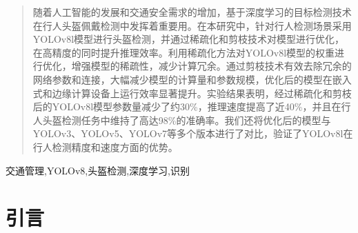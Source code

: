 \documentclass[journal]{IEEEtran}
\begin{document}







\maketitle

\begin{abstract}
随着人工智能的发展和交通安全需求的增加，基于深度学习的目标检测技术在行人头盔佩戴检测中发挥着重要用。在本研究中，针对行人检测场景采用YOLOv8l模型进行头盔检测，并通过稀疏化和剪枝技术对模型进行优化，在高精度的同时提升推理效率。利用稀疏化方法对YOLOv8l模型的权重进行优化，增强模型的稀疏性，减少计算冗余。通过剪枝技术有效去除冗余的网络参数和连接，大幅减少模型的计算量和参数规模，优化后的模型在嵌入式和边缘计算设备上运行效率显著提升。实验结果表明，经过稀疏化和剪枝后的YOLOv8l模型参数量减少了约30\%，推理速度提高了近40\%，并且在行人头盔检测任务中维持了高达98\%的准确率。我们还将优化后的模型与YOLOv3、YOLOv5、YOLOv7等多个版本进行了对比，验证了YOLOv8l在行人检测精度和速度方面的优势。
\end{abstract}

\begin{IEEEkeywords}
交通管理,YOLOv8,头盔检测,深度学习,识别
\end{IEEEkeywords}

%
\IEEEpeerreviewmaketitle

\section{引言}
\end{document}
